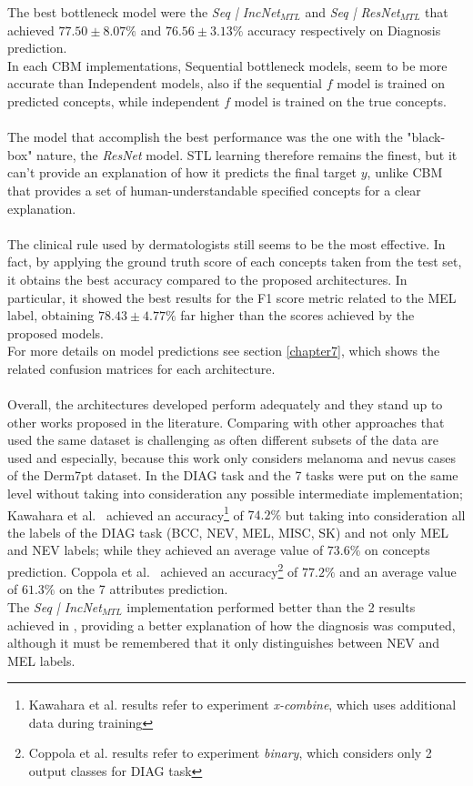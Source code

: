 The best bottleneck model were the \textit{Seq | IncNet$_{MTL}$} and \textit{Seq | ResNet$_{MTL}$} that achieved $77.50\pm8.07\%$ and $76.56\pm3.13\%$ accuracy respectively on Diagnosis prediction.\\
In each CBM implementations, Sequential bottleneck models, seem to be more accurate than Independent models, also if the sequential $f$ model is trained on predicted concepts, while independent $f$ model is trained on the true concepts.
\\\\
The model that accomplish the best performance was the one with the "black-box" nature, the \emph{ResNet} model. STL learning therefore remains the finest, but it can't provide an explanation of how it predicts the final target $y$, unlike CBM that provides a set of human-understandable specified concepts for a clear explanation.
\\\\
The clinical rule used by dermatologists still seems to be the most effective. In fact, by applying the ground truth score of each concepts taken from the test set, it obtains the best accuracy compared to the proposed architectures. In particular, it showed the best results for the F1 score metric related to the MEL label, obtaining $ 78.43\pm4.77 \% $ far higher than the scores achieved by the proposed models.\\
For more details on model predictions see section \ref{chapter7}, which shows the related confusion matrices for each architecture.
\\\\
Overall, the architectures developed perform adequately and they stand up to other works proposed in the literature.
Comparing with other approaches that used the same dataset is challenging as often different subsets of the data are used and especially, because this work only considers melanoma and nevus cases of the Derm7pt dataset.
In \cite{Kawahara,mtl7ptCoppola} the DIAG task and the 7 tasks were put on the same level without taking into consideration any possible intermediate implementation;
Kawahara et al.~\cite{Kawahara} achieved an accuracy\footnote{Kawahara et al.\cite{Kawahara} results refer to experiment \textit{x-combine}, which uses additional data during training} of $74.2\%$ but taking into consideration all the labels of the DIAG task (BCC, NEV, MEL, MISC, SK) and not only MEL and NEV labels; while they achieved an average value of $73.6\%$ on concepts prediction.
Coppola et al.~\cite{mtl7ptCoppola} achieved an accuracy\footnote{Coppola et al.\cite{mtl7ptCoppola} results refer to experiment \textit{binary}, which considers only 2 output classes for DIAG task} of $77.2\%$ and an average value of $61.3\%$ on the 7 attributes prediction.\\
The \textit{Seq | IncNet$_{MTL}$} implementation performed better than the 2 results achieved in \cite{Kawahara,mtl7ptCoppola}, providing a better explanation of how the diagnosis was computed, although it must be remembered that it only distinguishes between NEV and MEL labels.


